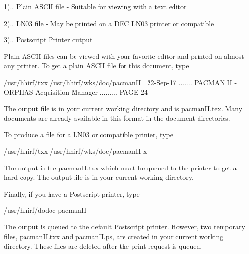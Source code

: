           1).. Plain ASCII file   - Suitable for viewing with a text editor
 
          2).. LN03 file - May be printed on a DEC LN03 printer or compatible
 
          3).. Postscript Printer output
 
   Plain ASCII files can be viewed with your favorite editor  and  printed  on
   almost any printer.  To get a plain ASCII file for this document, type
 
      /usr/hhirf/txx /usr/hhirf/wks/doc/pacmanII
    
   22-Sep-17 ....... PACMAN II - ORPHAS Acquisition Manager ......... PAGE  24
 
 
   The  output  file is in your current working directory and is pacmanII.tex.
   Many documents are  already  available  in  this  format  in  the  document
   directories.
 
   To produce a file for a LN03 or compatible printer, type
 
      /usr/hhirf/txx /usr/hhirf/wks/doc/pacmanII x
 
   The  output is file pacmanII.txx which must be queued to the printer to get
   a hard copy.  The output file is in your current working directory.
 
   Finally, if you have a Postscript printer, type
 
      /usr/hhirf/dodoc pacmanII
 
   The output is queued to the  default  Postscript  printer.   However,   two
   temporary  files, pacmanII.txx and pacmanII.ps, are created in your current
   working directory.  These files are  deleted  after  the  print  request is
   queued.
